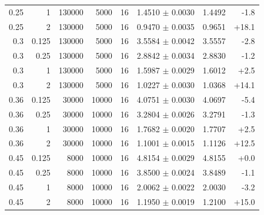 {\begin{longtable}[]{@{}rrrrrrrr@{}}
0.25 & 1 & 130000 & 5000 & 16 & 1.4510 $\pm$ 0.0030 & 1.4492 & -1.8 \\
0.25 & 2 & 130000 & 5000 & 16 & 0.9470 $\pm$ 0.0035 & 0.9651 & +18.1 \\
0.3 & 0.125 & 130000 & 5000 & 16 & 3.5584 $\pm$ 0.0042 & 3.5557 & -2.8 \\
0.3 & 0.25 & 130000 & 5000 & 16 & 2.8842 $\pm$ 0.0034 & 2.8830 & -1.2 \\
0.3 & 1 & 130000 & 5000 & 16 & 1.5987 $\pm$ 0.0029 & 1.6012 & +2.5 \\
0.3 & 2 & 130000 & 5000 & 16 & 1.0227 $\pm$ 0.0030 & 1.0368 & +14.1 \\
0.36 & 0.125 & 30000 & 10000 & 16 & 4.0751 $\pm$ 0.0030 & 4.0697 & -5.4 \\
0.36 & 0.25 & 30000 & 10000 & 16 & 3.2804 $\pm$ 0.0026 & 3.2791 & -1.3 \\
0.36 & 1 & 30000 & 10000 & 16 & 1.7682 $\pm$ 0.0020 & 1.7707 & +2.5 \\
0.36 & 2 & 30000 & 10000 & 16 & 1.1001 $\pm$ 0.0015 & 1.1126 & +12.5 \\
0.45 & 0.125 & 8000 & 10000 & 16 & 4.8154 $\pm$ 0.0029 & 4.8155 & +0.0 \\
0.45 & 0.25 & 8000 & 10000 & 16 & 3.8500 $\pm$ 0.0024 & 3.8489 & -1.1 \\
0.45 & 1 & 8000 & 10000 & 16 & 2.0062 $\pm$ 0.0022 & 2.0030 & -3.2 \\
0.45 & 2 & 8000 & 10000 & 16 & 1.1950 $\pm$ 0.0019 & 1.2100 & +15.0 \\
\end{longtable}
}

